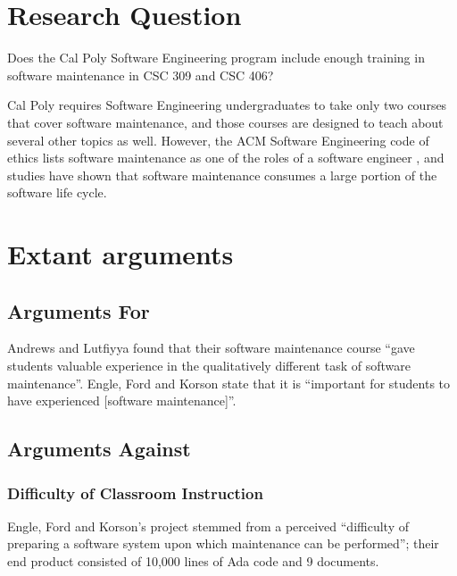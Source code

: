 \documentclass[11pt]{article}
\begin{document}
\begin{multicols}{2}
\section{Research Question}

Does the Cal Poly Software Engineering program include enough training in software maintenance in CSC 309 and CSC 406?

Cal Poly requires Software Engineering undergraduates to take only two courses that cover software maintenance, and those courses are designed to teach about several other topics as well. \cite{catalogCourses}  However, the ACM Software Engineering code of ethics lists software maintenance as one of the roles of a software engineer \cite{secode}, and studies have shown that software maintenance consumes a large portion of the software life cycle. \cite{stark97} \cite{parekh}

\section{Extant arguments}

\subsection{Arguments For}

Andrews and Lutfiyya found that their software maintenance course ``gave students valuable experience in the qualitatively different task of software maintenance''. \cite{Andrews:2000:ERS:794188.794320}  Engle, Ford and Korson state that it is ``important for students to have experienced [software maintenance]''. \cite{engle}

\subsection{Arguments Against}

\subsubsection{Difficulty of Classroom Instruction}

Engle, Ford and Korson's project stemmed from a perceived ``difficulty of preparing a software system upon which maintenance can be performed''; their end product consisted of 10,000 lines of Ada code and 9 documents. \cite{engle}


\end{multicols}
\end{document}
